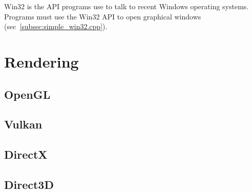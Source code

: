 \documentclass{article}
\begin{document}
Win32 is the API programs use to talk to recent Windows operating systems.
Programs must use the Win32 API to open graphical windows
(sec~\ref{subsec:simple_win32.cpp}).


\pagebreak
\section{Rendering}
\label{sec:rendering}


\subsection{OpenGL}
\label{subsec:opengl}


\subsection{Vulkan}
\label{subsec:vulkan}


\subsection{DirectX}
\label{subsec:directx}


\subsection{Direct3D}
\label{subsec:direct3d}

\end{document}
